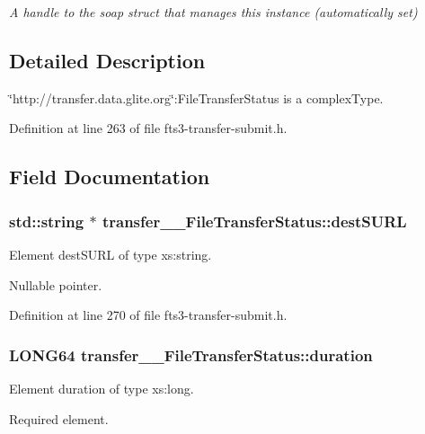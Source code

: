 \begin{DoxyCompactItemize}
\begin{DoxyCompactList}\small\item\em A handle to the soap struct that manages this instance (automatically set) \item\end{DoxyCompactList}\end{DoxyCompactItemize}


\subsection{Detailed Description}
\char`\"{}http://transfer.data.glite.org\char`\"{}:FileTransferStatus is a complexType. 

Definition at line 263 of file fts3-\/transfer-\/submit.h.



\subsection{Field Documentation}
\subsubsection[{destSURL}]{\setlength{\rightskip}{0pt plus 5cm}std::string $\ast$ {\bf transfer\_\-\_\-FileTransferStatus::destSURL}}\label{classtransfer____FileTransferStatus_a350d3ba3d24685a4decd929d2c0deab7}


Element destSURL of type xs:string. 

Nullable pointer. 

Definition at line 270 of file fts3-\/transfer-\/submit.h.

\subsubsection[{duration}]{\setlength{\rightskip}{0pt plus 5cm}LONG64 {\bf transfer\_\-\_\-FileTransferStatus::duration}}\label{classtransfer____FileTransferStatus_a8b0726ff54bc997e0ad3b55c62da196a}


Element duration of type xs:long. 

Required element. 

